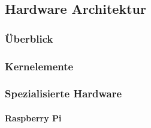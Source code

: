 \subsection{Hardware Architektur}
\label{subsec:hardware-architektur}

\subsubsection{Überblick}

\subsubsection{Kernelemente}



\subsubsection{Spezialisierte Hardware}
\paragraph{Raspberry Pi}
\label{par:raspi}
